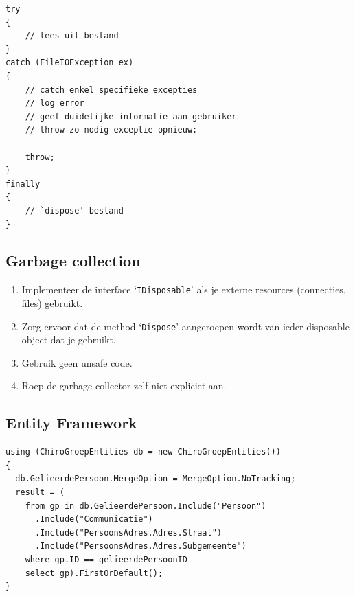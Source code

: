 \documentclass[a4paper,11pt]{article}
\begin{document}
\begin{lstlisting}[float,caption=Exception handling]
try
{
	// lees uit bestand
}
catch (FileIOException ex)
{
	// catch enkel specifieke excepties
	// log error
	// geef duidelijke informatie aan gebruiker
	// throw zo nodig exceptie opnieuw:

	throw;
}
finally
{
	// `dispose' bestand
}
\end{lstlisting}

\subsection{Garbage collection}

\begin{enumerate}[resume]
\item Implementeer de interface `\lstinline !IDisposable!' als je externe resources (connecties,
files) gebruikt.
\item Zorg ervoor dat de method `\lstinline !Dispose!' aangeroepen wordt van ieder disposable
object dat je gebruikt.
\item Gebruik geen unsafe code.
\item Roep de garbage collector zelf niet expliciet aan.
\end{enumerate}

\subsection{Entity Framework}


\begin{lstlisting}[float, caption=Entity Framework]
using (ChiroGroepEntities db = new ChiroGroepEntities())
{
  db.GelieerdePersoon.MergeOption = MergeOption.NoTracking;
  result = (
    from gp in db.GelieerdePersoon.Include("Persoon")
      .Include("Communicatie")
      .Include("PersoonsAdres.Adres.Straat")
      .Include("PersoonsAdres.Adres.Subgemeente")
    where gp.ID == gelieerdePersoonID
    select gp).FirstOrDefault();
}
\end{lstlisting}
\end{document}
